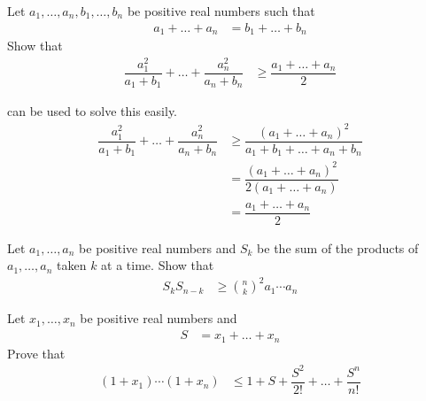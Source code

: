 \documentclass{subfile}
\begin{document}
		\begin{problem}
			Let $a_{1},\ldots,a_{n},b_{1},\ldots,b_{n}$ be positive real numbers such that
				\begin{align*}
					a_{1}+\ldots+a_{n}
						& = b_{1}+\ldots+b_{n}
				\end{align*}
			Show that
				\begin{align*}
					\dfrac{a_{1}^{2}}{a_{1}+b_{1}}+\ldots+\dfrac{a_{n}^{2}}{a_{n}+b_{n}}
						& \geq\dfrac{a_{1}+\ldots+a_{n}}{2}
				\end{align*}

				\begin{solution}
					 can be used to solve this easily.
						\begin{align*}
							\dfrac{a_{1}^{2}}{a_{1}+b_{1}}+\ldots+\dfrac{a_{n}^{2}}{a_{n}+b_{n}}
								& \geq \dfrac{(a_{1}+\ldots+a_{n})^{2}}{a_{1}+b_{1}+\ldots+a_{n}+b_{n}}\\
								& = \dfrac{(a_{1}+\ldots+a_{n})^{2}}{2(a_{1}+\ldots+a_{n})}\\
								& = \dfrac{a_{1}+\ldots+a_{n}}{2}
						\end{align*}
				\end{solution}
		\end{problem}

		\begin{problem}
			Let $a_{1},\ldots,a_{n}$ be positive real numbers and $S_{k}$ be the sum of the products of $a_{1},\ldots,a_{n}$ taken $k$ at a time. Show that
				\begin{align*}
					S_{k}S_{n-k}
						& \geq\binom{n}{k}^{2}a_{1}\cdots a_{n}
				\end{align*}
		\end{problem}

		\begin{problem}
			Let $x_{1},\ldots,x_{n}$ be positive real numbers and
				\begin{align*}
					S
						& = x_{1}+\ldots+x_{n}
				\end{align*}
			Prove that
				\begin{align*}
					(1+x_{1})\cdots(1+x_{n})
						& \leq 1+S+\dfrac{S^2}{2!}+\ldots+\dfrac{S^n}{n!}
				\end{align*}
		\end{problem}
\end{document}
